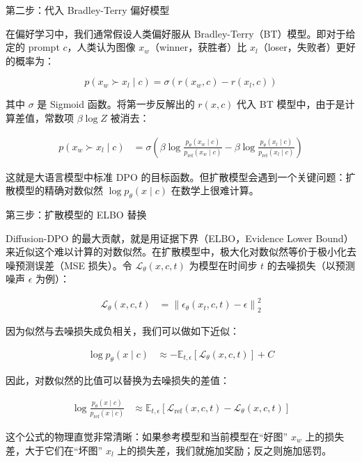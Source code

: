 第二步：代入 Bradley-Terry 偏好模型

在偏好学习中，我们通常假设人类偏好服从 Bradley-Terry（BT）模型。即对于给定的 prompt \(c\)，人类认为图像 \(x_w\)（winner，获胜者）比 \(x_l\)（loser，失败者）更好的概率为：

\[
p(x_w\succ x_l\mid c)=\sigma\left(r(x_w,c)-r(x_l,c)\right)
\]

其中 \(\sigma\) 是 Sigmoid 函数。将第一步反解出的 \(r(x,c)\) 代入 BT 模型中，由于是计算差值，常数项 \(\beta\log Z\) 被消去：

\[
\begin{aligned}
p(x_w\succ x_l\mid c)
&=\sigma\left(
\beta\log\frac{p_\theta(x_w\mid c)}{p_{\mathrm{ref}}(x_w\mid c)}
-\beta\log\frac{p_\theta(x_l\mid c)}{p_{\mathrm{ref}}(x_l\mid c)}
\right)
\end{aligned}
\]

这就是大语言模型中标准 DPO 的目标函数。但扩散模型会遇到一个关键问题：扩散模型的精确对数似然 \(\log p_\theta(x\mid c)\) 在数学上很难计算。

第三步：扩散模型的 ELBO 替换

Diffusion-DPO 的最大贡献，就是用证据下界（ELBO，Evidence Lower Bound）来近似这个难以计算的对数似然。在扩散模型中，极大化对数似然等价于极小化去噪预测误差（MSE 损失）。令 \(\mathcal{L}_\theta(x,c,t)\) 为模型在时间步 \(t\) 的去噪损失（以预测噪声 \(\epsilon\) 为例）：

\[
\begin{aligned}
\mathcal{L}_\theta(x,c,t)
&=\left\lVert \epsilon_\theta(x_t,c,t)-\epsilon\right\rVert_2^2
\end{aligned}
\]

因为似然与去噪损失成负相关，我们可以做如下近似：

\[
\begin{aligned}
\log p_\theta(x\mid c)
&\approx -\mathbb{E}_{t,\epsilon}\left[\mathcal{L}_\theta(x,c,t)\right]+C
\end{aligned}
\]

因此，对数似然的比值可以替换为去噪损失的差值：

\[
\begin{aligned}
\log\frac{p_\theta(x\mid c)}{p_{\mathrm{ref}}(x\mid c)}
&\approx
\mathbb{E}_{t,\epsilon}
\left[
\mathcal{L}_{\mathrm{ref}}(x,c,t)-\mathcal{L}_\theta(x,c,t)
\right]
\end{aligned}
\]

这个公式的物理直觉非常清晰：如果参考模型和当前模型在``好图'' \(x_w\) 上的损失差，大于它们在``坏图'' \(x_l\) 上的损失差，我们就施加奖励；反之则施加惩罚。

